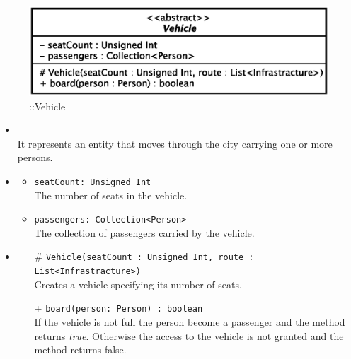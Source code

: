 \begin{figure}[h]
\centering
\includegraphics[scale=0.6,keepaspectratio]{images/solution/app/backend/vehicle.eps}
\caption{\pActive::Vehicle}
\label{fig:sd-app-vehicle}
\end{figure}
\FloatBarrier
\begin{itemize}
  \item \textbf{\descr} \\
    It represents an entity that moves through the city carrying one or more
persons.
  \item \textbf{\attrs}
  \begin{itemize}
    \item \texttt{seatCount: Unsigned Int} \\
The number of seats in the vehicle.
    \item \texttt{passengers: Collection<Person>} \\
The collection of passengers carried by the vehicle.
  \end{itemize}
  \item \textbf{\ops}
  \begin{itemize} 
    \item[\#] \texttt{Vehicle(seatCount : Unsigned Int, route : List<Infrastracture>)} \\
Creates a vehicle specifying its number of seats.
    \item[+] \texttt{board(person: Person) : boolean} \\
If the vehicle is not full the person become a passenger and the method 
returns \textit{true}. Otherwise the access to the vehicle is not granted and 
the method returns false.
  \end{itemize}
\end{itemize}
